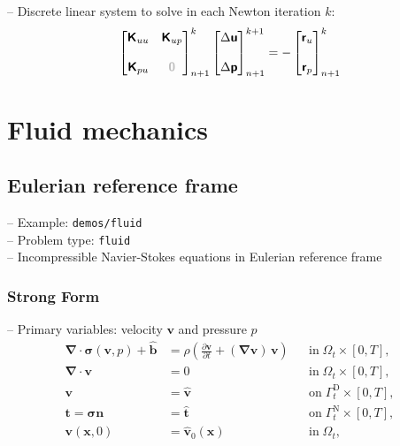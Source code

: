 \documentclass[a4paper,12pt]{report}
\newcommand{\bs}[1]{\boldsymbol{#1}}
\newcommand{\Om}{\mathit{\Omega}}
\newcommand{\Gm}{\mathit{\Gamma}}
\newcommand{\zerom}{\textcolor{lightgray}{\bs{\mathsf{0}}}}
\newcommand{\ROP}{\bs{\mathsf{r}}}
\begin{document}
-- Discrete linear system to solve in each Newton iteration $k$:
\begin{align}
\begin{bmatrix} \bs{\mathsf{K}}_{uu} & \bs{\mathsf{K}}_{up} \\ \\ \bs{\mathsf{K}}_{pu} & \zerom \end{bmatrix}_{n+1}^{k}\begin{bmatrix} \Delta\bs{\mathsf{u}} \\ \\ \Delta\bs{\mathsf{p}} \end{bmatrix}_{n+1}^{k+1}=-\begin{bmatrix} \ROP_{u} \\ \\ \ROP_{p} \end{bmatrix}_{n+1}^{k} \label{eq:lin_sys_solid_incomp}
\end{align}


\section{Fluid mechanics}\label{sec:fluid}

\subsection{Eulerian reference frame}\label{subsec:fluid:eulerian}

-- Example: \verb.demos/fluid.\\

-- Problem type: \verb.fluid.\\

-- Incompressible Navier-Stokes equations in Eulerian reference frame\\

\subsubsection{Strong Form}
-- Primary variables: velocity $\bs{v}$ and pressure $p$
\begin{align}
\bs{\nabla} \cdot \bs{\sigma}(\bs{v},p) + \hat{\bs{b}} &= \rho\left(\frac{\partial\bs{v}}{\partial t} + (\bs{\nabla}\bs{v})\,\bs{v}\right) &&\text{in} \; \mathit{\Om}_t \times [0, T], \label{eq:divsigma_ns} \\
\bs{\nabla}\cdot \bs{v} &= 0 &&\text{in} \; \mathit{\Om}_t \times [0, T],\label{eq:divv_ns}\\
\bs{v} &= \hat{\bs{v}} &&\text{on} \; \mathit{\Gm}_t^{\mathrm{D}} \times [0, T], \label{eq:bc_v_ns}\\
\bs{t} = \bs{\sigma}\bs{n} &= \hat{\bs{t}} &&\text{on} \; \mathit{\Gm}_t^{\mathrm{N}} \times [0, T], \label{eq:bc_N_ns}\\
\bs{v}(\bs{x},0) &= \hat{\bs{v}}_{0}(\bs{x}) &&\text{in} \; \mathit{\Om}_t, \label{eq:ini_v_ns}
\end{align}
\end{document}
